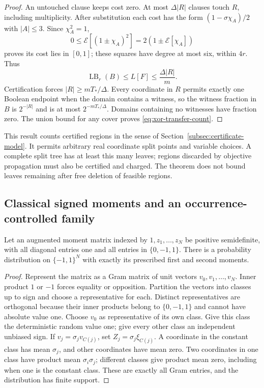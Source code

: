 \begin{proof}
An untouched clause keeps cost zero. At most $\Delta|R|$ clauses touch
$R$, including multiplicity. After substitution each cost has the form
$(1-\sigma\chi_A)/2$ with $|A|\le3$. Since $\chi_A^2=1$,
\[
 0\le\mathcal E[(1\pm\chi_A)^2]
       =2(1\pm\mathcal E[\chi_A])
\]
proves its cost lies in $[0,1]$; these squares have degree at most six,
within $4r$. Thus
\begin{equation}\label{eq:xor-node-cost}
 \operatorname{LB}_r(B)\le L[F]\le\frac{\Delta|R|}{m}.
\end{equation}
Certification forces $|R|\ge mT_*/\Delta$. Every coordinate in $R$
permits exactly one Boolean endpoint when the domain contains a witness,
so the witness fraction in $B$ is $2^{-|R|}$ and is at most
$2^{-mT_*/\Delta}$. Domains containing no witnesses have fraction zero.
The union bound for any cover proves \eqref{eq:xor-transfer-count}.
\end{proof}

This result counts certified regions in the sense of
Section~\ref{subsec:certificate-model}. It permits arbitrary real coordinate
split points and variable choices. A complete split tree has at least this
many leaves; regions discarded by objective propagation must also be
certified and charged. The theorem does not bound leaves remaining after
free deletion of feasible regions.

\subsection{Classical signed moments and an occurrence-controlled family}
\begin{lemma}\label{lem:signed-moment-law}
Let an augmented moment matrix indexed by $1,z_1,\ldots,z_N$ be positive
semidefinite, with all diagonal entries one and all entries in
$\{0,-1,1\}$. There is a probability distribution on $\{-1,1\}^N$
with exactly its prescribed first and second moments.
\end{lemma}
\begin{proof}
Represent the matrix as a Gram matrix of unit vectors $v_0,v_1,\ldots,v_N$.
Inner product $1$ or $-1$ forces equality or opposition. Partition the
vectors into classes up to sign and choose a representative for each.
Distinct representatives are orthogonal because their inner products
belong to $\{0,-1,1\}$ and cannot have absolute value one. Choose $v_0$
as representative of its own class. Give this class the deterministic
random value one; give every other class an independent unbiased sign.
If $v_j=\sigma_j v_{C(j)}$, set $Z_j=\sigma_j\xi_{C(j)}$.
A coordinate in the constant class has mean $\sigma_j$, and other
coordinates have mean zero. Two coordinates in one class have product
mean $\sigma_i\sigma_j$; different classes give product mean zero,
including when one is the constant class. These are exactly all Gram
entries, and the distribution has finite support.
\end{proof}


